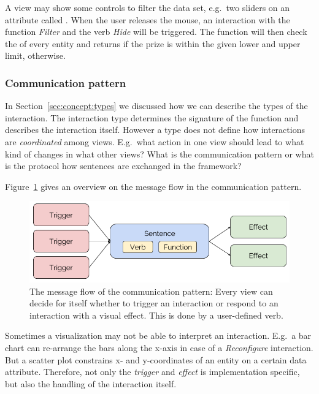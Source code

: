 \documentclass{article}
\newcommand{\attr}[1]{\texttt{\detokenize{#1}}}
\begin{document}
A view may show some controls to filter the data set, e.g.\ two sliders on an attribute called \attr{prize}.
When the user releases the mouse, an interaction with the function \emph{Filter} and the verb \emph{Hide} will be triggered.  
The function will then check the \attr{prize} of every entity and returns \attr{true} if the prize is within the given lower and upper limit, \attr{false} otherwise.

\subsubsection{Communication pattern}

In Section~\ref{sec:concept:types} we discussed how we can describe the types of the interaction.
The interaction type determines the signature of the function and describes the interaction itself.
However a type does not define how interactions are \emph{coordinated} among views.
E.g.\ what action in one view should lead to what kind of changes in what other views?
What is the communication pattern or what is the protocol how sentences are exchanged in the framework?

Figure~\ref{fig:concept:communication-pattern} gives an overview on the message flow in the communication pattern.
\begin{figure}[h!]
  \centering
  \includegraphics[width=\textwidth]{images/concept/communication-pattern.png}
  \caption{%
    The message flow of the communication pattern:
    Every view can decide for itself whether to trigger an interaction or respond to an interaction with a visual effect.
    This is done by a user-defined verb.
  }\label{fig:concept:communication-pattern}
\end{figure}

Sometimes a visualization may not be able to interpret an interaction.
E.g.\ a bar chart can re-arrange the bars along the x-axis in case of a \emph{Reconfigure} interaction.
But a scatter plot constrains x- and y-coordinates of an entity on a certain data attribute.
Therefore, not only the \emph{trigger} and \emph{effect} is implementation specific, but also the handling of the interaction itself.
\end{document}

